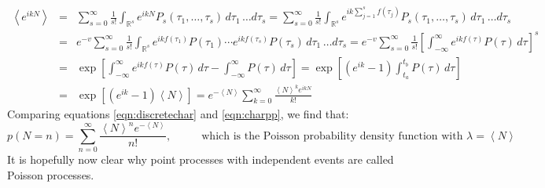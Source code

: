\documentclass{article}
\begin{document}
\begin{eqnarray}
\left< e^{ikN} \right> & = & \sum_{s=0}^{\infty} \frac{1}{s!} \int_{\mathbb{R}^{s}} e^{ikN} P_s(\tau_1,\ldots,\tau_s) \, d\tau_1 \, \ldots d\tau_s =  \sum_{s=0}^{\infty} \frac{1}{s!} \int_{\mathbb{R}^{s}} e^{ik\sum_{j=1}^s f(\tau_j)} P_s(\tau_1,\ldots,\tau_s) \, d\tau_1 \, \ldots d\tau_s \nonumber  \\
& = & e^{-v} \sum_{s=0}^{\infty} \frac{1}{s!} \int_{\mathbb{R}^{s}} e^{ik f(\tau_1)} P(\tau_1) \cdots e^{ik f(\tau_s)} P(\tau_s) \, d\tau_1 \, \ldots d\tau_s  = e^{-v} \sum_{s=0}^{\infty} \frac{1}{s!} \left[ \int_{-\infty}^{\infty} e^{ikf(\tau)} P(\tau) \, d\tau \right]^s \nonumber \\
& = & \exp \left[\int_{-\infty}^{\infty} e^{ikf(\tau)} P(\tau) \, d\tau  - \int_{-\infty}^{\infty} P(\tau) \, d\tau \right] = \exp \left[  \left( e^{ik} - 1 \right) \int_{t_a}^{t_b} P(\tau) \, d\tau \right] \nonumber \\
& = & \exp \left[  \left( e^{ik} - 1 \right)  \left< N \right> \right] = e^{-\left< N \right>} \sum_{k=0}^{\infty} \frac{\left< N \right>^k e^{ikN}}{k!} \label{eqn:charpp}
\end{eqnarray}
Comparing equations \ref{eqn:discretechar} and \ref{eqn:charpp}, we find that:
\[ p(N=n) =   \sum_{n=0}^{\infty} \frac{\left< N \right>^n e^{-\left< N \right>}}{n!}, \hspace{1cm} \textrm{ which is the Poisson probability density function with } \lambda = \left< N \right>\]
It is hopefully now clear why point processes with independent events are called Poisson processes.
\end{document}
